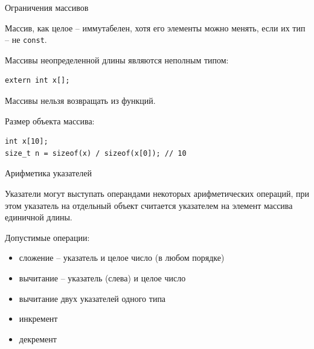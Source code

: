 \documentclass[unknownkeysallowed,xcolor=table]{beamer}
\begin{document}
\begin{frame}[fragile]{Ограничения массивов}

Массив, как целое -- иммутабелен, хотя его элементы можно менять, если их тип -- не \lstinline{const}.

\vspace{1.5em}

Массивы неопределенной длины являются неполным типом:

\vspace{1em}

\begin{lstlisting}
extern int x[];
\end{lstlisting}

\vspace{1em}

Массивы нельзя возвращать из функций.

\vspace{1em}

Размер объекта массива:

\begin{lstlisting}
int x[10];
size_t n = sizeof(x) / sizeof(x[0]); // 10
\end{lstlisting}

\end{frame}

\begin{frame}{Арифметика указателей}

Указатели могут выступать операндами некоторых арифметических операций, при этом указатель на отдельный объект считается указателем на элемент массива единичной длины.

\vspace{1em}

Допустимые операции:

\vspace{0.5em}

\begin{itemize}
  \item сложение -- указатель и целое число (в любом порядке)
  \item вычитание -- указатель (слева) и целое число
  \item вычитание двух указателей одного типа
  \item инкремент
  \item декремент
\end{itemize}

\end{frame}
\end{document}
